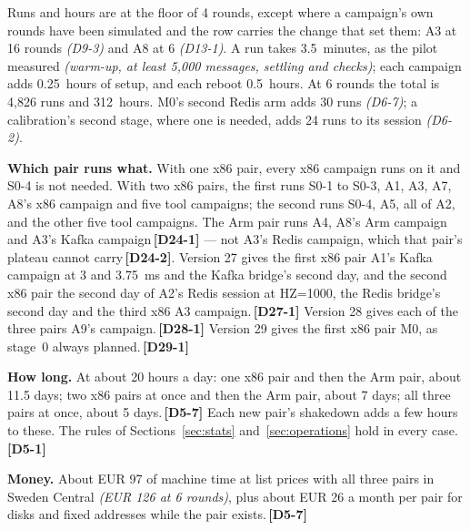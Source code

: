 \documentclass[11pt]{article}
\newcommand{\gl}[1]{{\color{soft}\itshape\small (#1)}}
\newcommand{\chg}[1]{\,{\color{chgcol}\bfseries\footnotesize[#1]}}
\newcommand{\chgold}[1]{\,{\color{oldcol}\bfseries\footnotesize[#1]}}
\begin{document}
Runs and hours are at the floor of 4 rounds, except where a campaign's own rounds have been
simulated and the row carries the change that set them: A3 at 16 rounds \gl{D9-3} and A8 at 6
\gl{D13-1}. A run takes 3.5~minutes, as the pilot measured \gl{warm-up, at least 5,000 messages, settling and checks}; each campaign adds 0.25~hours of setup, and each reboot 0.5~hours. At 6 rounds the total is 4,826 runs and 312~hours. M0's second Redis arm adds 30 runs \gl{D6-7}; a calibration's second stage, where one is needed, adds 24 runs to its session \gl{D6-2}.

\textbf{Which pair runs what.} With one x86 pair, every x86 campaign runs on it and S0-4 is not needed. With two x86 pairs, the first runs S0-1 to S0-3, A1, A3, A7, A8's x86 campaign and five tool campaigns; the second runs S0-4, A5, all of A2, and the other five tool campaigns. The Arm pair runs A4, A8's Arm campaign and A3's Kafka campaign\chgold{D24-1} --- not A3's Redis campaign, which that pair's plateau cannot carry\chgold{D24-2}. Version 27 gives the first x86 pair A1's Kafka campaign at 3 and 3.75~ms and the Kafka bridge's second day, and the second x86 pair the second day of A2's Redis session at HZ=1000, the Redis bridge's second day and the third x86 A3 campaign.\chgold{D27-1} Version 28 gives each of the three pairs A9's campaign.\chgold{D28-1} Version 29 gives the first x86 pair M0, as stage~0 always planned.\chg{D29-1}

\textbf{How long.} At about 20 hours a day: one x86 pair and then the Arm pair, about 11.5 days; two x86 pairs at once and then the Arm pair, about 7 days; all three pairs at once, about 5 days.\chgold{D5-7} Each new pair's shakedown adds a few hours to these. The rules of Sections~\ref{sec:stats} and~\ref{sec:operations} hold in every case.\chgold{D5-1}

\textbf{Money.} About EUR 97 of machine time at list prices with all three pairs in Sweden Central \gl{EUR 126 at 6 rounds}, plus about EUR 26 a month per pair for disks and fixed addresses while the pair exists.\chgold{D5-7}
\end{document}
